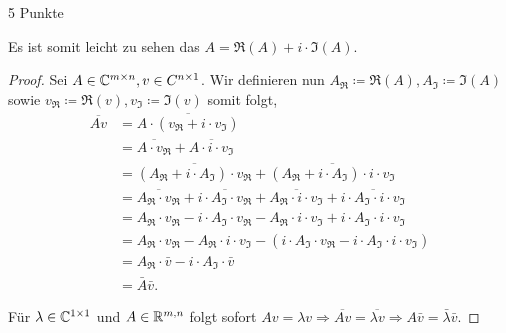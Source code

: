 \documentclass{problemset}
\begin{document}
\begin{problem}{5 Punkte}
\begin{definition}
    Es ist somit leicht zu sehen das \(A = \Re(A) + i \cdot \Im(A)\).
\end{definition}

\begin{proof}
    Sei \(A \in \mathbb{C}^{m \times n}, v \in C^{n \times 1}\). Wir definieren nun
    \(A_\Re \coloneq \Re(A), A_\Im \coloneq \Im(A)\) sowie \(v_\Re \coloneq \Re(v),
    v_\Im \coloneq \Im(v)\) somit folgt, \begin{align}
        \overline{Av} & = \overline{A \cdot (v_\Re + i \cdot v_\Im)}                                                                                                                \\
                      & = \overline{A \cdot v_\Re} + \overline{A \cdot i \cdot v_\Im}                                                                                               \\
                      & = \overline{(A_\Re + i \cdot A_\Im) \cdot v_\Re} + \overline{(A_\Re + i \cdot A_\Im) \cdot i \cdot v_\Im}                                                   \\
                      & = \overline{A_\Re \cdot v_\Re} + \overline{i \cdot A_\Im \cdot v_\Re} + \overline{A_\Re \cdot i \cdot v_\Im} + \overline{i \cdot A_\Im \cdot i \cdot v_\Im} \\
                      & = A_\Re \cdot v_\Re  - i \cdot A_\Im \cdot v_\Re - A_\Re \cdot i \cdot v_\Im + i \cdot A_\Im \cdot i \cdot v_\Im                                            \\
                      & = A_\Re \cdot v_\Re  - A_\Re \cdot i \cdot v_\Im - (i \cdot A_\Im \cdot v_\Re - i \cdot A_\Im \cdot i \cdot v_\Im)                                          \\
                      & = A_\Re \cdot \bar{v} - i \cdot A_\Im \cdot \bar{v}                                                                                                         \\
                      & = \bar{A}\bar{v}.
    \end{align}

    Für \(\lambda \in \mathbb{C}^{1 \times 1}\) und \(A \in \mathbb{R}^{m,n}\) folgt
    sofort \(Av = \lambda v \Rightarrow \overline{Av} = \overline{\lambda v}
    \Rightarrow A\bar{v} = \bar{\lambda}\bar{v}\).
\end{proof}
\end{problem}
\end{document}
